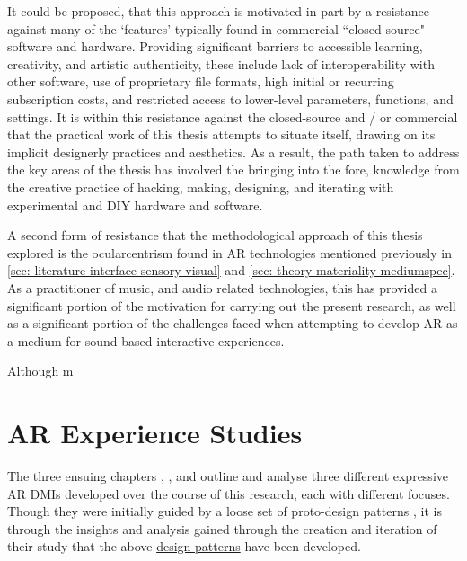 It could be proposed, that this approach is motivated in part by a resistance against many of the `features' typically found in commercial ``closed-source" software and hardware. Providing significant barriers to accessible learning, creativity, and artistic authenticity, these include lack of interoperability with other software, use of proprietary file formats, high initial or recurring subscription costs, and restricted access to lower-level parameters, functions, and settings. It is within this resistance against the closed-source and / or commercial that the practical work of this thesis attempts to situate itself, drawing on its implicit designerly practices and aesthetics. As a result, the path taken to address the key areas of the thesis has involved the bringing into the fore, knowledge from the creative practice of hacking, making, designing, and iterating with experimental and DIY hardware and software.

A second form of resistance that the methodological approach of this thesis explored is the ocularcentrism found in AR technologies mentioned previously in \autoref{sec: literature-interface-sensory-visual} and \autoref{sec: theory-materiality-mediumspec}. As a practitioner of music, and audio related technologies, this has provided a significant portion of the motivation for carrying out the present research, as well as a significant portion of the challenges faced when attempting to develop AR as a medium for sound-based interactive experiences.

Although m






\section{AR Experience Studies}
The three ensuing chapters \textit{}, \textit{}, and \textit{} outline and analyse three different expressive AR DMIs developed over the course of this research, each with different focuses. Though they were initially guided by a loose set of proto-design patterns \citep{bilbow2021b}, it is through the insights and analysis gained through the creation and iteration of their study that the above \hyperref[sec: discussion-patterns]{design patterns} have been developed.

